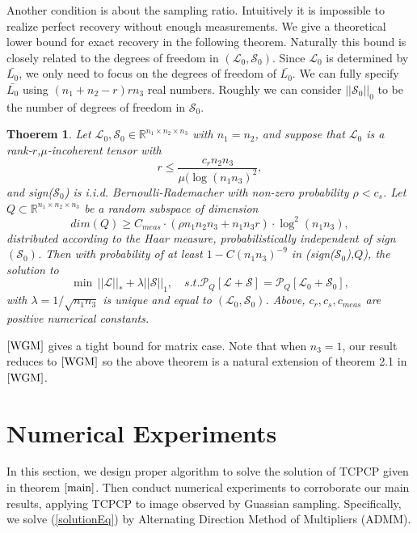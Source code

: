 \documentclass[journal,transmag]{IEEEtran}
\newtheorem{theorem}{Thoerem}[section]
\theoremstyle{plain}
\begin{document}
Another condition is about the sampling ratio. Intuitively it is impossible to realize perfect recovery without enough measurements. We give a theoretical lower bound for exact recovery in the following theorem. Naturally this bound is closely related to the degrees of freedom in $(\mathcal{L}_0, \mathcal{S}_0)$. Since $\mathcal{L}_0$ is determined by $\bar{L_0}$, we only need to focus on the degrees of freedom of $\bar{L_0}$. We can fully specify $\bar{L_0}$ using $(n_1+n_2-r)rn_3$ real numbers. Roughly we can consider $||\mathcal{S}_0||_0$ to be the number of degrees of freedom in $\mathcal{S}_0$.
\begin{theorem} \label{main}
Let $\mathcal{L}_0,\mathcal{S}_0\in \mathbb{R}^{n_1\times n_2 \times n_3}$ with $n_1=n_2$, and suppose that $\mathcal{L}_0$ is a rank-$r$,$\mu$-incoherent tensor with
\begin{equation}
r\le \frac{c_r n_2 n_3}{\mu (\log(n_1 n_3)^2},
\end{equation}
and sign($\mathcal{S}_0$) is i.i.d. Bernoulli-Rademacher with non-zero probability $\rho<c_{s}$. Let $Q \subset \mathbb{R}^{n_1 \times n_2 \times n_3}$ be a random subspace of dimension
\begin{equation}
dim(Q)\ge C_{meas}\cdot (\rho n_1 n_2 n_3 + n_1 n_3 r)\cdot  \log^2 (n_1 n_3),
\end{equation}
distributed according to the Haar measure, probabilistically independent of sign$(\mathcal{S}_0)$. Then with probability of at least $1-C(n_1 n_3)^{-9}$ in (sign($\mathcal{S}_0$),$Q$), the solution to
\begin{equation}\label{solutionEq}
\min \, ||\mathcal{L}||_{*}+\lambda||\mathcal{S}||_1, \quad s.t.\mathcal{P}_Q[\mathcal{L+S}]=\mathcal{P}_Q[\mathcal{L}_0+\mathcal{S}_0],
\end{equation}
with $\lambda = 1/\sqrt{n_1 n_3}$ is unique and equal to $(\mathcal{L}_0,\mathcal{S}_0)$. Above, $c_r,c_s,c_{meas}$ are positive numerical constants.
\end{theorem}
$\cite{WGM}$ gives a tight bound for matrix case. Note that when $n_3=1$, our result reduces to $\cite{WGM}$ so the above theorem is a natural extension of theorem 2.1 in $\cite{WGM}$.

\section{Numerical Experiments}
In this section, we design proper algorithm to solve the solution of TCPCP given in theorem $\ref{main}$. Then conduct numerical experiments to corroborate our main results, applying TCPCP to image observed by Guassian sampling. Specifically, we solve (\ref{solutionEq}) by Alternating Direction Method of Multipliers (ADMM).
\end{document}
